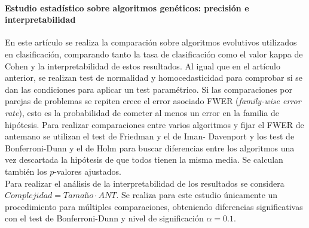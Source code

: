 	\paragraph{Estudio estadístico sobre algoritmos 
genéticos: precisión e interpretabilidad} \cite{GARCIA08} En 
este artículo se realiza la comparación sobre algoritmos 
evolutivos utilizados en clasificación, comparando tanto la 
tasa de clasificación como el valor kappa de Cohen y la 
interpretabilidad de estos resultados. Al igual que en el 
artículo anterior, se realizan test de normalidad y 
homocedasticidad para comprobar si se dan las condiciones 
para aplicar un test paramétrico. Si las comparaciones por 
parejas de problemas se repiten crece el error asociado FWER 
(\textit{family-wise error rate}), esto es la probabilidad de 
cometer al menos un error en la familia de hipótesis. Para realizar 
comparaciones entre varios algoritmos y fijar el FWER de 
antemano se utilizan el test de Friedman y el de Iman-
Davenport y los test de Bonferroni-Dunn y el de Holm para 
buscar diferencias entre los algoritmos una vez descartada la 
hipótesis de que todos tienen la misma media. Se 
calculan también los $p$-valores ajustados.\\
	Para realizar el análisis de la interpretabilidad de los 
resultados se considera $\textit{Complejidad} = 
\textit{Tamaño} \cdot ANT$. Se realiza para este estudio 
únicamente un procedimiento para múltiples comparaciones, 
obteniendo diferencias significativas con el test de 
Bonferroni-Dunn y nivel de significación $\alpha=0.1$.
	
